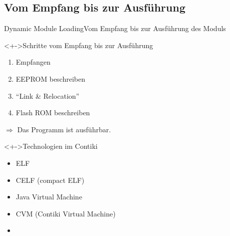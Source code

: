 \subsection{Vom Empfang bis zur Ausführung}
\begin{frame}{Dynamic Module Loading}{Vom Empfang bis zur Ausführung des Moduls}
	\begin{block}<+->{Schritte vom Empfang bis zur Ausführung}
		\begin{enumerate}
		\item 	Empfangen
		\item 	EEPROM beschreiben
		\item 	\enquote{Link \& Relocation}
		\item 	Flash ROM beschreiben
		\end{enumerate}
		$\Rightarrow$ 	Das Programm ist ausführbar.
	\end{block}
	\begin{block}<+->{Technologien im Contiki}
		\begin{itemize}
		\item 	ELF
		\item 	CELF (compact ELF)
		\item 	Java Virtual Machine
		\item 	CVM (Contiki Virtual Machine)
		\item 	{}
		\end{itemize}
	\end{block}
\end{frame}
